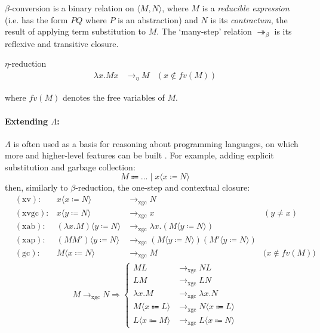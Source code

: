 $\beta$-conversion is a binary relation on $\langle{M,N}\rangle$, where $M$ is a \emph{reducible expression} (i.e. has the form $PQ$ where $P$ is an abstraction) and $N$ is its \emph{contractum}, the result of applying term substitution to $M$. The `many-step' relation $\twoheadrightarrow_{\beta}$ is its reflexive and transitive closure. \cite{tsfpl}

\begin{defn}$\eta$-reduction\label{def:eta-reduction}
	$$
	\begin{aligned}
	\lambda{x}.Mx &\to_{\eta} M &(x\notin{fv(M)})
	\end{aligned}
	$$
\end{defn} where $fv(M)$ denotes the free variables of $M$.

\paragraph{Extending $\Lambda$:}\label{extending-lambda}

$\Lambda$ is often used as a basis for reasoning about programming languages, on which more and higher-level features can be built \cite{tpl}. For example, adding explicit substitution and garbage collection: $$
M \Coloneqq \dots \mid x\langle{x \coloneqq N}\rangle
$$ then, similarly to $\beta$-reduction, the one-step and contextual closure: \cite{lambda_xgc, tsfpl}
$$
\begin{aligned}
	&(\textrm{xv})\colon &x\langle{x \coloneqq N}\rangle &\to_{\textrm{xgc}} N \\
	&(\textrm{xvgc})\colon &x\langle{y \coloneqq N}\rangle &\to_{\textrm{xgc}} x &(y \neq x) \\
	&(\textrm{xab})\colon &(\lambda{x}.M)\langle{y \coloneqq N}\rangle &\to_{\textrm{xgc}} \lambda{x}.(M\langle{y \coloneqq N}\rangle) \\
	&(\textrm{xap})\colon &(MM')\langle{y \coloneqq N}\rangle &\to_{\textrm{xgc}} (M\langle{y \coloneqq N}\rangle)(M'\langle{y \coloneqq N}\rangle) \\
	&(\textrm{gc})\colon &M\langle{x \coloneqq N}\rangle &\to_{\textrm{xgc}} M &\big(x \notin fv(M)\big)
\end{aligned}
$$$$
\begin{aligned}
	M \to_{\textrm{xgc}} N \Rightarrow \begin{cases}
		ML &\to_{\textrm{xgc}} NL \\
		LM &\to_{\textrm{xgc}} LN \\
		\lambda{x}.M &\to_{\textrm{xgc}} \lambda{x}.N \\
		M\langle{x \Coloneqq L}\rangle &\to_{\textrm{xgc}} N\langle{x \Coloneqq L}\rangle \\
		L\langle{x \Coloneqq M}\rangle &\to_{\textrm{xgc}} L\langle{x \Coloneqq N}\rangle
	\end{cases}
\end{aligned}
$$

